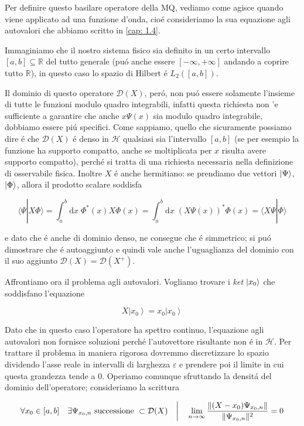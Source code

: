 Per definire questo basilare operatore della MQ, vediamo come agisce quando viene applicato ad una funzione d'onda, cio\'e consideriamo la sua equazione agli autovalori che abbiamo scritto in \ref{cap: 1.4}.

Immaginiamo che il nostro sistema fisico sia definito in un certo intervallo $[a, b] \subseteq \mathbb{R}$ del tutto generale (pu\'o anche essere $[-\infty, +\infty]$ andando a coprire tutto $\mathbb{R}$), in questo caso lo spazio di Hilbert \'e $L_2([a, b])$.

Il dominio di questo operatore $\mathcal{D}(X)$, per\'o, non pu\'o essere solamente l'insieme di tutte le funzioni modulo quadro integrabili, infatti questa richiesta non 'e sufficiente a garantire che anche $x\Psi(x)$ sia modulo quadro integrabile, dobbiamo essere pi\'u specifici. Come sappiamo, quello che sicuramente possiamo dire \'e che $\mathcal{D}(X)$ \'e denso in $\mathcal{H}$ qualsiasi sia l'intervallo $[a, b]$ (se per esempio la funzione ha supporto compatto, anche se moltiplicata per $x$ risulta avere supporto compatto), perch\'e si tratta di una richiesta necessaria nella definizione di osservabile fisica. Inoltre $X$ \'e anche hermitiano: se prendiamo due vettori $\ket{\Psi}$, $\ket{\Phi}$, allora il prodotto scalare soddisfa
	
$$\langle\Psi|X\Phi\rangle=\int_{a}^{b}\mathrm{d}x\;\Phi^{*}(x)X\Phi(x)=\int_{a}^{b}\mathrm{d}x\;(X\Psi(x))^{*}\Phi(x)=\langle X\Psi|\Phi\rangle$$  

e dato che \'e anche di dominio denso, ne consegue che \'e simmetrico; si pu\'o dimostrare che \'e autoaggiunto e quindi vale anche l'uguaglianza del dominio con il suo aggiunto $\mathcal{D}(X) = \mathcal{D}(X^+)$.

Affrontiamo ora il problema agli autovalori. Vogliamo trovare i \textit{ket} $\ket{x_0}$ che soddisfano l'equazione

$$X\left|x_{0}\right\rangle=x_{0}\left|x_{0}\right\rangle$$

Dato che in questo caso l'operatore ha spettro continuo, l'equazione agli autovalori non fornisce soluzioni perch\'e l'autovettore risultante non \'e in $\mathcal{H}$. Per trattare il problema in maniera rigorosa dovremmo discretizzare lo spazio dividendo l'asse reale in intervalli di larghezza $\varepsilon$ e prendere poi il limite in cui questa grandezza tende a 0.
Operiamo comunque sfruttando la densit\'a del dominio dell'operatore; consideriamo la scrittura

\begin{equation}
	\label{eq:oper X}
	\forall x_{0}\in[a,b]\quad\exists\Psi_{x_{0},n}\text{ successione }\subset\mathcal{D}(X)\quad\bigg{|}\quad\lim_{n\to\infty}\frac{\|(X-x_{0})\Psi_{x_{0},n}\|}{\|\Psi_{x_{0},n}\|^{2}}=0
\end{equation} 

